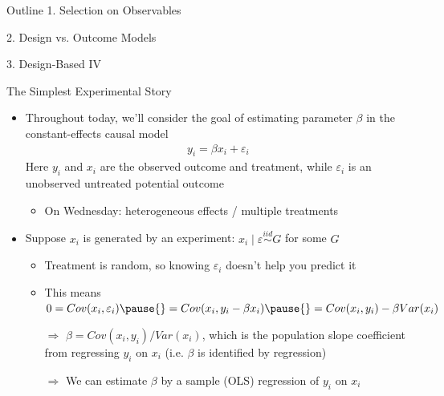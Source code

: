 \documentclass[11pt, english]{beamer}
\begin{document}
	\begin{frame}{Outline}
		1. Selection on Observables
		\vspace{0.8cm}

		2. Design vs. Outcome Models
		\vspace{0.8cm}

		3. Design-Based IV
	\end{frame}

	\begin{frame}{The Simplest Experimental Story}
		\begin{itemize}
			\item Throughout today, we'll consider the goal of estimating parameter
				$\beta$ in the constant-effects causal model
				\begin{align*}
					y_{i} = \beta x_{i} + \varepsilon_{i}
				\end{align*}
				Here $y_{i}$ and $x_{i}$ are the observed outcome and treatment, while $\varepsilon
				_{i}$ is an unobserved untreated potential outcome
				\smallskip
				\pause{}
				\begin{itemize}
					\item On Wednesday: heterogeneous effects / multiple treatments
				\end{itemize}
				\medskip
				\pause{}

			\item Suppose $x_{i}$ is generated by an experiment:
				$x_{i}\mid \varepsilon \stackrel{iid}{\sim}G$ for some $G$
				\smallskip
				\pause{}
				\begin{itemize}
					\item Treatment is random, so knowing $\varepsilon_{i}$ doesn't help
						you predict it
						\smallskip

					\item This means $0=Cov(x_{i},\varepsilon_{i})\pause{}=Cov(x_{i},y_{i}-
						\beta x_{i})\pause{}=Cov(x_{i},y_{i})-\beta Var(x_{i})$
						\smallskip
						\pause{}

					\item[$\Rightarrow$] $\beta=Cov(x_{i},y_{i})/Var(x_{i})$, which is the
						population slope coefficient from regressing $y_{i}$ on $x_{i}$ (i.e.
						$\beta$ is identified by regression)
						\smallskip
						\pause{}

					\item[$\Rightarrow$] We can estimate $\beta$ by a sample (OLS) regression
						of $y_{i}$ on $x_{i}$
				\end{itemize}
		\end{itemize}
	\end{frame}
\end{document}
